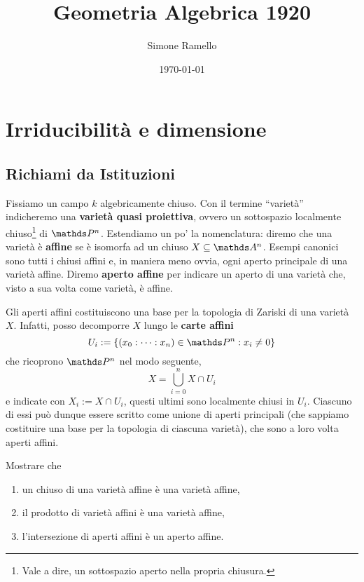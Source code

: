 \documentclass[twoside,openright,titlepage,numbers=noenddot,%
               headinclude,footinclude,cleardoublepage=empty,abstract=on,
               BCOR=23mm,paper=letter,fontsize=11pt
               ]{scrreprt}
\title{Geometria Algebrica 1920}
\author{Simone Ramello}
\date{\today}
\begin{document}
\maketitle
\chapter{Irriducibilità e dimensione}
\section{Richiami da Istituzioni}
Fissiamo un campo $k$ algebricamente chiuso. Con il termine ``varietà'' indicheremo una \textbf{varietà quasi proiettiva}, ovvero un sottospazio localmente chiuso\footnote{Vale a dire, un sottospazio aperto nella propria chiusura.} di $\PP^n$. Estendiamo un po' la nomenclatura: diremo che una varietà è \textbf{affine} se è isomorfa ad un chiuso $X \subseteq \AA^n$. Esempi canonici sono tutti i chiusi affini e, in maniera meno ovvia, ogni aperto principale di una varietà affine. Diremo \textbf{aperto affine} per indicare un aperto di una varietà che, visto a sua volta come varietà, è affine.
\begin{remark}
    Gli aperti affini costituiscono una base per la topologia di Zariski di una varietà $X$. Infatti, posso decomporre $X$ lungo le \textbf{carte affini}
    \[ U_i := \{(x_0: \dots :x_n) \in \PP^n: x_i \neq 0\} \]
    che ricoprono $\PP^n$ nel modo seguente,
    \[ X = \bigcup_{i=0}^{n} X\cap U_i \]
    e indicate con $X_i := X \cap U_i$, questi ultimi sono localmente chiusi in $U_i$. Ciascuno di essi può dunque essere scritto come unione di aperti principali (che sappiamo costituire una base per la topologia di ciascuna varietà), che sono a loro volta aperti affini.
\end{remark}
\begin{exercise}
    Mostrare che
    \begin{enumerate}
        \item un chiuso di una varietà affine è una varietà affine,
        \item il prodotto di varietà affini è una varietà affine,
        \item l'intersezione di aperti affini è un aperto affine.
    \end{enumerate}
\end{exercise}
\end{document}
